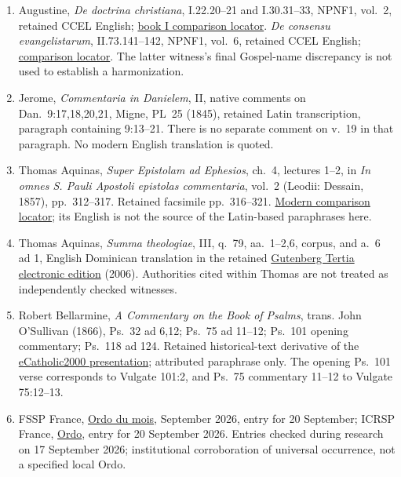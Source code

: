 \begin{enumerate}
\item Augustine, \textit{De doctrina christiana}, I.22.20--21 and I.30.31--33, NPNF1, vol.~2, retained CCEL English; \href{https://www.newadvent.org/fathers/12021.htm}{book I comparison locator}. \textit{De consensu evangelistarum}, II.73.141--142, NPNF1, vol.~6, retained CCEL English; \href{https://www.newadvent.org/fathers/1602273.htm}{comparison locator}. The latter witness's final Gospel-name discrepancy is not used to establish a harmonization.
\item Jerome, \textit{Commentaria in Danielem}, II, native comments on Dan.~9:17,18,20,21, Migne, PL~25 (1845), retained Latin transcription, paragraph containing 9:13--21. There is no separate comment on v.~19 in that paragraph. No modern English translation is quoted.
\item Thomas Aquinas, \textit{Super Epistolam ad Ephesios}, ch.~4, lectures 1--2, in \textit{In omnes S. Pauli Apostoli epistolas commentaria}, vol.~2 (Leodii: Dessain, 1857), pp.~312--317. Retained facsimile pp.~316--321. \href{https://isidore.co/aquinas/Eph4.htm}{Modern comparison locator}; its English is not the source of the Latin-based paraphrases here.
\item Thomas Aquinas, \textit{Summa theologiae}, III, q.~79, aa.~1--2,6, corpus, and a.~6 ad 1, English Dominican translation in the retained \href{https://www.gutenberg.org/ebooks/19950}{Gutenberg Tertia electronic edition} (2006). Authorities cited within Thomas are not treated as independently checked witnesses.
\item Robert Bellarmine, \textit{A Commentary on the Book of Psalms}, trans. John O'Sullivan (1866), Ps.~32 ad 6,12; Ps.~75 ad 11--12; Ps.~101 opening commentary; Ps.~118 ad 124. Retained historical-text derivative of the \href{https://www.ecatholic2000.com/bellarmine/commentary-on-psalms.shtml}{eCatholic2000 presentation}; attributed paraphrase only. The opening Ps.~101 verse corresponds to Vulgate 101:2, and Ps.~75 commentary 11--12 to Vulgate 75:12--13.
\item FSSP France, \href{https://www.fssp.fr/ordo-du-mois/}{Ordo du mois}, September 2026, entry for 20 September; ICRSP France, \href{https://icrspfrance.fr/ordo.php}{Ordo}, entry for 20 September 2026. Entries checked during research on 17 September 2026; institutional corroboration of universal occurrence, not a specified local Ordo.

\end{enumerate}
